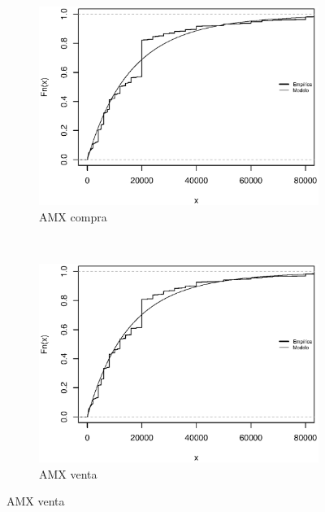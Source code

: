 \documentclass[11pt]{article}
\numberwithin{equation}{section} %
\begin{document}
\begin{figure}[htbp]
\centering
\begin{subfigure}[b]{0.5\textwidth}
\centering
\includegraphics[width=\textwidth, trim=0 0.5cm 0 1cm]{amxvolumencompra.eps}
\caption{AMX compra}
\label{fig:amxvolumencompra}
\end{subfigure}%
~ %
\begin{subfigure}[b]{0.5\textwidth}
\centering
\includegraphics[width=\textwidth, trim=0 0.5cm 0 1cm]{amxvolumenventa.eps}
\caption{AMX venta}
\label{fig:amxvolumenventa}
\end{subfigure}


\end{figure}
\end{document}
